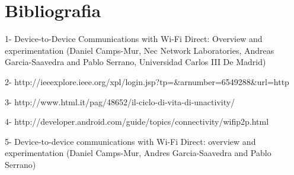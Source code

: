 \chapter{Bibliografia}

1- Device-to-Device Communications with Wi-Fi Direct: Overview and
   experimentation (Daniel Camps-Mur, Nec Network Laboratories, Andreas
   Garcia-Saavedra and Pablo Serrano, Universidad Carlos III De Madrid)
   
2- http://ieeexplore.ieee.org/xpl/login.jsp?tp=&arnumber=6549288&url=http%

3- http://www.html.it/pag/48652/il-ciclo-di-vita-di-unactivity/

4- http://developer.android.com/guide/topics/connectivity/wifip2p.html

5- Device-to-device communications with Wi-Fi Direct: overview and
   experimentation (Daniel Camps-Mur, Andres Garcia-Saavedra and Pablo Serrano)
   
